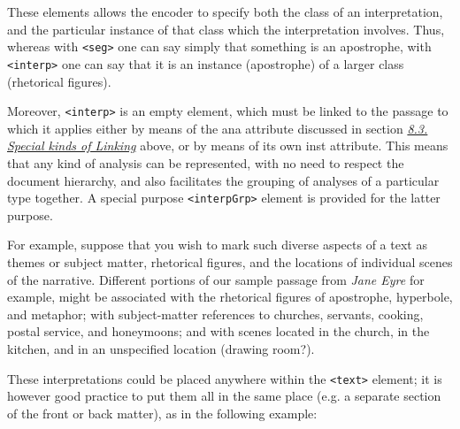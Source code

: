 \documentclass[11pt,twoside]{article}\makeatletter
\begin{document}
These elements allows the encoder to specify both the class of
an interpretation, and the particular instance of that class which the
interpretation involves. Thus, whereas with \texttt{<seg>} one can say
simply that something is an apostrophe, with
\texttt{<interp>} one can say that it is an instance (apostrophe) of a
larger class (rhetorical figures).\par Moreover, \texttt{<interp>}  is an empty element, which must be
linked to the passage to which it applies either by means of the
ana  attribute discussed in section \textit{\hyperref[xatts]{8.3. Special kinds of Linking}}
 above, or by means of its own inst attribute. This
means that any kind of analysis can be represented, with no need to
respect the document hierarchy, and also facilitates the grouping
of analyses of a particular type together. A special purpose \texttt{<interpGrp>}
element is provided for the latter purpose.\par For example, suppose that you wish to mark such diverse aspects of
a text as  themes or subject matter, rhetorical figures, and the
locations of individual scenes of the narrative. Different portions of
our sample passage from \textit{Jane Eyre} for example, might
be associated with the rhetorical figures of apostrophe, hyperbole,
and metaphor; with subject-matter references to churches, servants,
cooking, postal service, and honeymoons; and with scenes located in
the church, in the kitchen, and in an unspecified location (drawing
room?).\par These interpretations could be placed anywhere within the \texttt{<text>}
element; it is however good practice to put them all in the same place
(e.g. a separate section of the front or back matter), as in the
following example:
\end{document}
